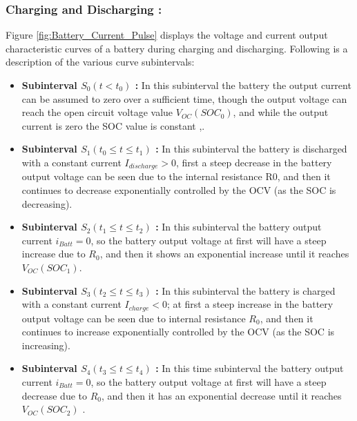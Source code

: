 \subsubsection{Charging and Discharging :}
Figure \ref{fig:Battery_Current_Pulse} displays the voltage and current output characteristic curves of a battery during charging and discharging. 
Following is a description of the various curve subintervals:

\begin{itemize}
	\item \textbf{Subinterval $S_0 (t < t_0 )$ :} In this subinterval the battery 
	the output current can be assumed to zero over a sufficient 
	time, though the output voltage can reach the open circuit 
	voltage value $V_{OC}(SOC_0)$, and while the output current is 
	zero the SOC value is constant \cite{UKEMPT_AHMAD2012},\cite{UniPadua_Giacomo}.
	\item \textbf{Subinterval $S_1 (t_0 \leq t \leq  t_1 )$ :}  In this subinterval the battery 
	is discharged with a constant current $I_{discharge} > 0$, first  
	a steep decrease in the battery output voltage can be seen 
	due to the internal resistance R0, and then it continues to 
	decrease exponentially controlled by the OCV (as the SOC 
	is decreasing)\cite{UKEMPT_AHMAD2012}. 
	\item \textbf{Subinterval $S_2 (t_1 \leq t \leq  t_2 )$ :} In this subinterval the battery 
	output current $i_{Batt} = 0$, so the battery output voltage at first 
	will have a steep increase due to $R_0$, and then it shows an 
	exponential increase until it reaches $V_{OC}(SOC_1)$. 
	\item \textbf{Subinterval $S_3 (t_2 \leq t \leq  t_3 )$ :} In this subinterval the battery 
	is charged with a constant current $I_{charge} < 0$; at first a steep 
	increase in the battery output voltage can be seen due to 
	internal resistance $R_0$, and then it continues to increase 
	exponentially controlled by the OCV (as the SOC is 
	increasing)\cite{UKEMPT_AHMAD2012}.
	\item \textbf{Subinterval $S_4 (t_3 \leq t \leq  t_4 )$ :} In this time subinterval the battery 
	output current $i_{Batt} = 0$, so the battery output voltage at first 
	will have a steep decrease due to $R_0$, and then it has an 
	exponential decrease until it reaches $V_{OC}(SOC_2)$ \cite{UKEMPT_AHMAD2012}. 
\end{itemize}

